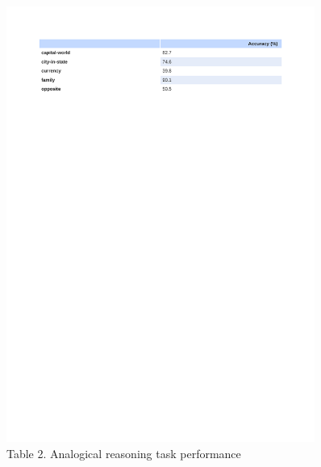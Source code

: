 \documentclass[12pt]{report}
\begin{document}
	\begin{figure}
		\includegraphics[trim=1.0cm 23cm 2cm 2cm, clip=true,width=0.9\textwidth]{./Figures/google-ana.pdf}
		\caption*{Table 2. Analogical reasoning task performance}
		\label{fig:analogical}
	\end{figure}
\end{document}
